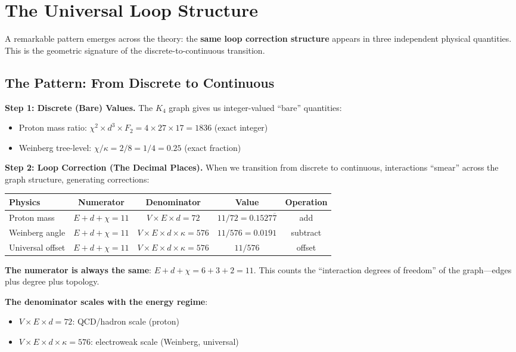 \documentclass[11pt,a4paper]{book}
\begin{document}
\section{The Universal Loop Structure}

A remarkable pattern emerges across the theory: the \textbf{same loop correction structure} appears in three independent physical quantities. This is the geometric signature of the discrete-to-continuous transition.

\subsection{The Pattern: From Discrete to Continuous}

\textbf{Step 1: Discrete (Bare) Values.} The $K_4$ graph gives us integer-valued ``bare'' quantities:
\begin{itemize}
\item Proton mass ratio: $\chi^2 \times d^3 \times F_2 = 4 \times 27 \times 17 = 1836$ (exact integer)
\item Weinberg tree-level: $\chi/\kappa = 2/8 = 1/4 = 0.25$ (exact fraction)
\end{itemize}

\textbf{Step 2: Loop Correction (The Decimal Places).} When we transition from discrete to continuous, interactions ``smear'' across the graph structure, generating corrections:

\begin{center}
\begin{tabular}{|l|c|c|c|c|}
\hline
\textbf{Physics} & \textbf{Numerator} & \textbf{Denominator} & \textbf{Value} & \textbf{Operation} \\
\hline
Proton mass & $E+d+\chi = 11$ & $V \times E \times d = 72$ & $11/72 = 0.1527\overline{7}$ & add \\
Weinberg angle & $E+d+\chi = 11$ & $V \times E \times d \times \kappa = 576$ & $11/576 = 0.0191$ & subtract \\
Universal offset & $E+d+\chi = 11$ & $V \times E \times d \times \kappa = 576$ & $11/576$ & offset \\
\hline
\end{tabular}
\end{center}

\textbf{The numerator is always the same}: $E + d + \chi = 6 + 3 + 2 = 11$. This counts the ``interaction degrees of freedom'' of the graph---edges plus degree plus topology.

\textbf{The denominator scales with the energy regime}:
\begin{itemize}
\item $V \times E \times d = 72$: QCD/hadron scale (proton)
\item $V \times E \times d \times \kappa = 576$: electroweak scale (Weinberg, universal)
\end{itemize}
\end{document}
